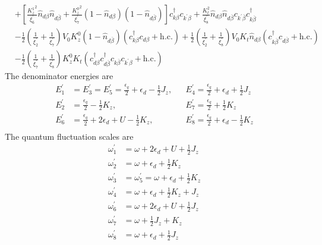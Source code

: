 \documentclass[twoside,11pt]{report}
\numberwithin{equation}{section}
\begin{document}
\begin{equation}
\begin{aligned}
&+\left[\frac{{K_z^1}^2}{\xi^\prime_6}\hat n_{d\beta}\hat n_{d\overline\beta} + \frac{{K_z^0}^2}{\xi^\prime_7}\left(1 - \hat n_{d\beta}\right)\left(1 - \hat n_{d\overline\beta}\right)\right]c^\dagger_{k\beta}c_{k^\prime\beta} + \frac{K_t^2}{\xi^\prime_8}\hat n_{d\beta}\hat n_{d\overline\beta}c_{k^\prime\overline\beta}c^\dagger_{k\overline\beta} \\
&- \frac{1}{2}\left(\frac{1}{\xi^\prime_2} + \frac{1}{\xi^\prime_7}\right)V_0 K_z^0\left(1 - \hat n_{d\overline\beta}\right)\left(c^\dagger_{k\beta}c_{d\beta} + \text{h.c.}\right) + \frac{1}{2}\left(\frac{1}{\xi^\prime_2} + \frac{1}{\xi^\prime_8}\right)V_0 K_t\hat n_{d\beta}\left(c^\dagger_{k\overline\beta}c_{d\overline\beta} + \text{h.c.}\right) \\
&- \frac{1}{2}\left(\frac{1}{\xi^\prime_7} + \frac{1}{\xi^\prime_8}\right)K_z^0 K_t\left(c^\dagger_{d\beta}c^\dagger_{d\overline\beta}c_{k\overline\beta}c_{k^\prime\beta} + \text{h.c.}\right) 
\end{aligned}\end{equation}
The denominator energies are
\begin{equation}\begin{aligned}
	E_1^\prime &= E_3^\prime = E_5^\prime = \frac{\epsilon_q}{2} + \epsilon_d - \frac{1}{2}J_z, &&E_4^\prime = \frac{\epsilon_q}{2} + \epsilon_d + \frac{1}{2}J_z\\
	E_2^\prime &= \frac{\epsilon_q}{2} - \frac{1}{2}K_z, &&E_7^\prime = \frac{\epsilon_q}{2} + \frac{1}{2}K_z\\
	E_6^\prime &= \frac{\epsilon_q}{2} + 2\epsilon_d + U - \frac{1}{2}K_z, &&E_8^\prime = \frac{\epsilon_q}{2} + \epsilon_d - \frac{1}{2}K_z\\
\end{aligned}\end{equation}
The quantum fluctuation scales are
\begin{equation}\begin{aligned}
	\omega_1^\prime&=\omega+2\epsilon_d+U+\frac{1}{2}J_z\\
	\omega_2^\prime&=\omega+\epsilon_d+\frac{1}{2}K_z \\
	\omega_3^\prime&=\omega_5^\prime=\omega+\epsilon_d + \frac{1}{2}K_z\\
	\omega_4^\prime&=\omega+\epsilon_d+\frac{1}{2}K_z + J_z \\
	\omega_6^\prime&=\omega+2\epsilon_d+U+\frac{1}{2}J_z\\
	\omega_7^\prime&=\omega+\frac{1}{2}J_z + K_z\\
	\omega_8^\prime &=\omega+\epsilon_d+\frac{1}{2}J_z \\
\end{aligned}\end{equation}
\end{document}
